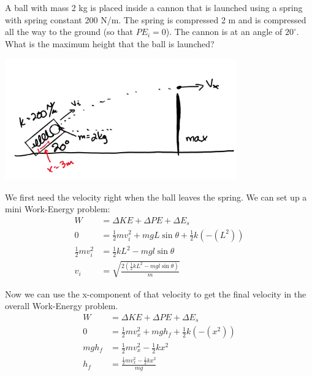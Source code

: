 \begin{problem}
    A ball with mass 2 kg is placed inside a cannon that is launched using a spring with spring constant 200 N/m. The spring is compressed 2 m and is compressed all the way to the ground (so that $PE_i = 0$). The cannon is at an angle of $20^\circ$. What is the maximum height that the ball is launched?

    \begin{center}
        \includegraphics[width=0.75\textwidth]{chapters/ch4/images/fig4_11.PNG}
    \end{center}

    We first need the velocity right when the ball leaves the spring. We can set up a mini Work-Energy problem:
    $$
    \begin{aligned}
        W &= \Delta KE + \Delta PE + \Delta E_s\\
        0 &= \frac{1}{2}mv_i^2 + mgL\sin\theta + \frac{1}{2}k(-(L^2))\\
        \frac{1}{2}mv_i^2 &= \frac{1}{2}kL^2 - mgl\sin\theta\\
        v_i &= \sqrt{\frac{2\left(\frac{1}{2}kL^2 - mgl\sin\theta\right)}{m}}
    \end{aligned}
    $$


    Now we can use the x-component of that velocity to get the final velocity in the overall Work-Energy problem.
    $$
    \begin{aligned}
        W &= \Delta KE + \Delta PE + \Delta E_s\\
        0 &= \frac{1}{2}mv_x^2 + mgh_f + \frac{1}{2}k(-(x^2))\\
        mgh_f &= \frac{1}{2}mv_x^2 -\frac{1}{2}kx^2\\
        h_f &= \frac{\frac{1}{2}mv_x^2 -\frac{1}{2}kx^2}{mg}
    \end{aligned}
    $$
\end{problem}